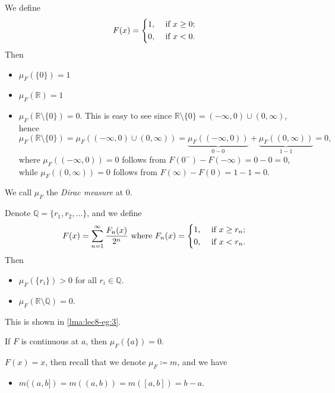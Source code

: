 \begin{eg}
	We define
	\[
		F(x) = \begin{dcases}
			1, & \text{ if } x\geq 0 ; \\
			0, & \text{ if } x<0.
		\end{dcases}
	\]
	Then
	\begin{itemize}
		\item \(\mu _F(\{0\})=1\)
		\item \(\mu _F(\mathbb{R} ) = 1\)
		\item \(\mu _F(\mathbb{R}\setminus \{0\} ) = 0\). This is easy to see since \(\mathbb{R} \setminus \{0\} = (-\infty , 0)\cup (0, \infty )\), hence
		      \[
			      \mu _F(\mathbb{R} \setminus \{0\}) = \mu _F((-\infty , 0)\cup (0, \infty ))
			      = \underbrace{\mu _F((-\infty , 0))}_{0 - 0} + \underbrace{\mu _F((0, \infty ))}_{1 -1 }= 0,
		      \]
		      where \(\mu _{F} ((-\infty , 0)) = 0\) follows from \(F(0^-) - F(-\infty ) = 0 - 0 = 0\), while
		      \(\mu _{F} ((0, \infty ))=0\) follows from \(F(\infty ) - F(0) = 1 - 1 = 0\).
	\end{itemize}
	We call \(\mu _F\) the \emph{Dirac measure} at \(0\).
\end{eg}

\begin{eg}\label{eg:lec8-3}
	Denote \(\mathbb{Q} = \{r_1, r_2, \dots  \}\), and we define
	\[
		F(x) = \sum_{n=1}^{\infty} \frac{F_n(x)}{2^n} \text{ where }  F_{n}(x) = \begin{dcases}
			1, & \text{ if } x \geq r_n; \\
			0, & \text{ if } x < r_n.    \\
		\end{dcases}
	\]
	Then
	\begin{itemize}
		\item \(\mu _F(\{r_{i}\})>0\) for all \(r_{i}\in\mathbb{Q} \).
		\item \(\mu _F(\mathbb{R} \setminus \mathbb{Q} ) = 0\).
	\end{itemize}
	This is shown in \autoref{lma:lec8-eg:3}.
\end{eg}

\begin{eg}
	If \(F\) is continuous at \(a\), then \(\mu _F(\{a\}) = 0\).
\end{eg}

\begin{eg}
	\(F(x) = x\), then recall that we denote \(\mu _F \coloneqq m\), and we have
	\begin{itemize}
		\item \( m((a, b]) = m((a, b)) = m([a, b]) = b - a\).
	\end{itemize}
\end{eg}

